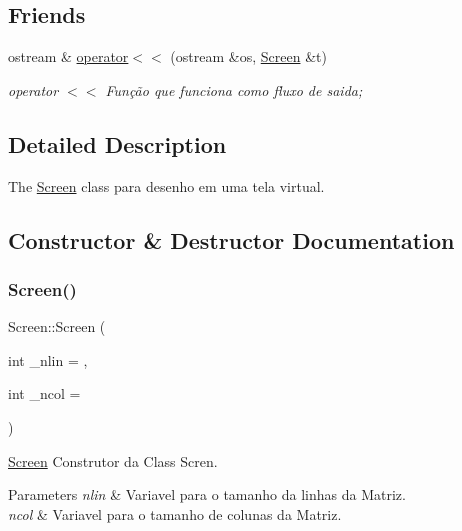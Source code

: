 \subsection*{Friends}
\begin{DoxyCompactItemize}
\item 
ostream \& \mbox{\hyperlink{class_screen_aab6a2880746bfe1b7964817cc8f0989e}{operator$<$$<$}} (ostream \&os, \mbox{\hyperlink{class_screen}{Screen}} \&t)
\begin{DoxyCompactList}\small\item\em operator $<$$<$ Função que funciona como fluxo de saida; \end{DoxyCompactList}\end{DoxyCompactItemize}


\subsection{Detailed Description}
The \mbox{\hyperlink{class_screen}{Screen}} class para desenho em uma tela virtual. 

\subsection{Constructor \& Destructor Documentation}
\mbox{\label{class_screen_ac0cb3fd57e5eb225d9756b8eb6311833}} 
\subsubsection{\texorpdfstring{Screen()}{Screen()}}
{\footnotesize\ttfamily Screen\+::\+Screen (\begin{DoxyParamCaption}\item[{int}]{\+\_\+nlin = {},  }\item[{int}]{\+\_\+ncol = {} }\end{DoxyParamCaption})}



\mbox{\hyperlink{class_screen}{Screen}} Construtor da Class Scren. 


\begin{DoxyParams}{Parameters}
{\em nlin} & Variavel para o tamanho da linhas da Matriz. \\
\hline
{\em ncol} & Variavel para o tamanho de colunas da Matriz. \\
\hline
\end{DoxyParams}
\mbox{\label{class_screen_a4243bc17596af96415b09ac48205676d}} 
